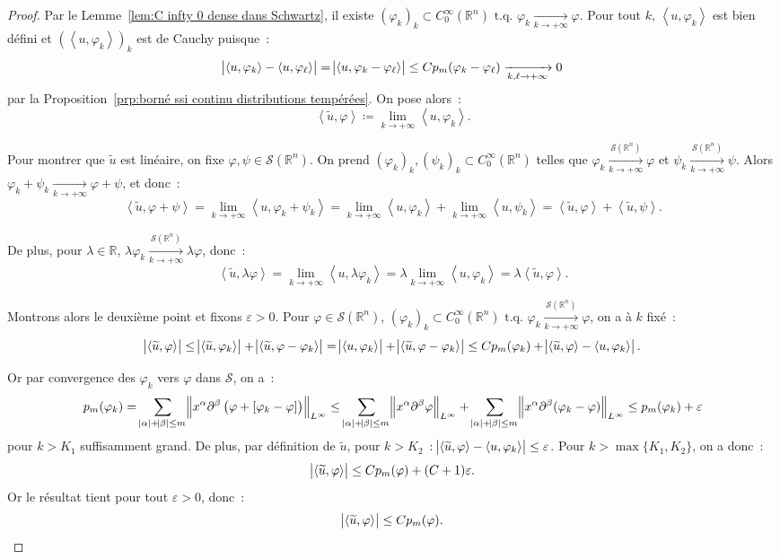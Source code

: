 \documentclass{report}
\newcommand{\R}{{\mathbb R}}
\newcommand{\scpr}[2]{\left\langle#1, #2\right\rangle}
\newcommand{\tq}{\text{ t.q. }}
\newcommand{\st}{\tq}
\newcommand{\pinfty}{{+\infty}}
\theoremstyle{definition}
\theoremstyle{remark}
\begin{document}
\begin{proof} Par le Lemme~\ref{lem:C infty 0 dense dans Schwartz}, il existe $(\varphi_k)_k \subset C^\infty_0(\R^n) \st \varphi_k \xrightarrow[k \to \pinfty]{} \varphi$. Pour tout
$k$, $\scpr u{\varphi_k}$ est bien défini et $(\scpr u{\varphi_k})_k$ est de Cauchy puisque~:
\[\abs {\scpr u{\varphi_k} - \scpr u{\varphi_\ell}} = \abs {\scpr u{\varphi_k-\varphi_\ell}} \leq Cp_m(\varphi_k-\varphi_\ell) \xrightarrow[k,\ell \to \pinfty]{} 0\]
par la Proposition~\ref{prp:borné ssi continu distributions tempérées}. On pose alors~:
\[\scpr {\widetilde u}\varphi \coloneqq \lim_{k \to \pinfty}\scpr u{\varphi_k}.\]

Pour montrer que $\widetilde u$ est linéaire, on fixe $\varphi, \psi \in \mathcal S(\R^n)$. On prend $(\varphi_k)_k, (\psi_k)_k \subset C^\infty_0(\R^n)$ telles que
$\varphi_k \xrightarrow[k \to \pinfty]{\mathcal S(\R^n)} \varphi$ et $\psi_k \xrightarrow[k \to \pinfty]{\mathcal S(\R^n)} \psi$.
Alors $\varphi_k + \psi_k \xrightarrow[k \to \pinfty]{} \varphi + \psi$, et donc~:
\[\scpr {\widetilde u}{\varphi + \psi} = \lim_{k \to \pinfty}\scpr u{\varphi_k+\psi_k} = \lim_{k \to \pinfty}\scpr u{\varphi_k}+\lim_{k \to \pinfty}\scpr u{\psi_k}
= \scpr {\widetilde u}\varphi + \scpr {\widetilde u}\psi.\]

De plus, pour $\lambda \in \R$, $\lambda\varphi_k \xrightarrow[k \to \pinfty]{\mathcal S(\R^n)} \lambda\varphi$, donc~:
\[\scpr {\widetilde u}{\lambda \varphi} = \lim_{k \to \pinfty}\scpr u{\lambda\varphi_k} = \lambda\lim_{k \to \pinfty}\scpr u{\varphi_k} = \lambda\scpr {\widetilde u}\varphi.\]

Montrons alors le deuxième point et fixons $\varepsilon > 0$. Pour $\varphi \in \mathcal S(\R^n)$,
$(\varphi_k)_k \subset C^\infty_0(\R^n) \st \varphi_k \xrightarrow[k \to \pinfty]{\mathcal S(\R^n)} \varphi$, on a à $k$ fixé~:
\[\abs {\scpr {\widetilde u}\varphi} \leq \abs {\scpr {\widetilde u}{\varphi_k}} + \abs {\scpr {\widetilde u}{\varphi-\varphi_k}}
= \abs {\scpr u{\varphi_k}} + \abs {\scpr {\widetilde u}{\varphi-\varphi_k}} \leq Cp_m(\varphi_k) + \abs {\scpr {\widetilde u}\varphi - \scpr u{\varphi_k}}.\]

Or par convergence des $\varphi_k$ vers $\varphi$ dans $\mathcal S$, on a~:
\[p_m(\varphi_k) = \sum_{\abs \alpha + \abs \beta \leq m}\norm {x^\alpha\partial^\beta\left(\varphi + [\varphi_k - \varphi]\right)}_{L^\infty}
\leq \sum_{\abs \alpha + \abs \beta \leq m}\norm {x^\alpha\partial^\beta\varphi}_{L^\infty}
	+ \sum_{\abs \alpha + \abs \beta \leq m}\norm {x^\alpha\partial^\beta(\varphi_k-\varphi)}_{L^\infty}
\leq p_m(\varphi_k) + \varepsilon\]
pour $k > K_1$ suffisamment grand. De plus, par définition de $\widetilde u$, pour $k > K_2$~: $\abs {\scpr {\widetilde u}\varphi - \scpr u{\varphi_k}} \leq \varepsilon$.
Pour $k > \max\{K_1, K_2\}$, on a donc~:
\[\abs {\scpr {\widetilde u}\varphi} \leq Cp_m(\varphi) + (C+1)\varepsilon.\]
Or le résultat tient pour tout $\varepsilon > 0$, donc~:
\[\abs {\scpr {\widetilde u}\varphi} \leq Cp_m(\varphi).\]


\end{proof}
\end{document}
